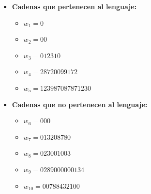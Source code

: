 \documentclass[11pt]{report}
\begin{document}
\begin{itemize}
\begin{figure}[H]
    \end{figure}
    \newpage
  \item \textbf{Cadenas que pertenecen al lenguaje: }
    \begin{itemize}
      \item $w_1 = 0$
      \item $w_2 = 00$
      \item $w_3 = 012310$
      \item $w_4 = 28720099172$
      \item $w_5 = 123987087871230$
    \end{itemize}
  \item \textbf{Cadenas que no pertenecen al lenguaje: }
    \begin{itemize}
      \item $w_6 = 000$
      \item $w_7 = 013208780$
      \item $w_8 = 023001003$
      \item $w_9 = 0289000000134$
      \item $w_{10} = 00788432100$
    \end{itemize}
\end{itemize}

\newpage
\end{document}
